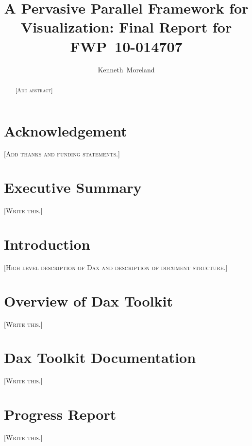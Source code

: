 \documentclass[12pt,report]{SANDreport}
\title{A Pervasive Parallel Framework for Visualization: Final Report for
  FWP~10-014707}
\author{Kenneth~Moreland}
\date{} %
\newcommand{\fix}[1]{{\color{red}\textsc{[#1]}}}
\begin{document}
\maketitle

\begin{abstract}
  \fix{Add abstract}
\end{abstract}

\clearpage

\chapter*{Acknowledgement}

\fix{Add thanks and funding statements.}

\cleardoublepage %
\tableofcontents
\listoffigures
\listoftables

\clearpage

\chapter*{Executive Summary}

\fix{Write this.}

\SANDmain %

\chapter{Introduction}
\label{chap:Introduction}

\fix{High level description of Dax and description of document structure.}

\chapter{Overview of Dax Toolkit}
\label{chap:Overview}

\fix{Write this.}

\chapter{Dax Toolkit Documentation}
\label{chap:Documentation}

\fix{Write this.}

\chapter{Progress Report}
\label{chap:ProgressReport}

\fix{Write this.}

\clearpage

\providecommand*{\phantomsection}{}
\phantomsection
{}



\begin{SANDdistribution}[NM]

  \bigskip

\end{SANDdistribution}
\end{document}
